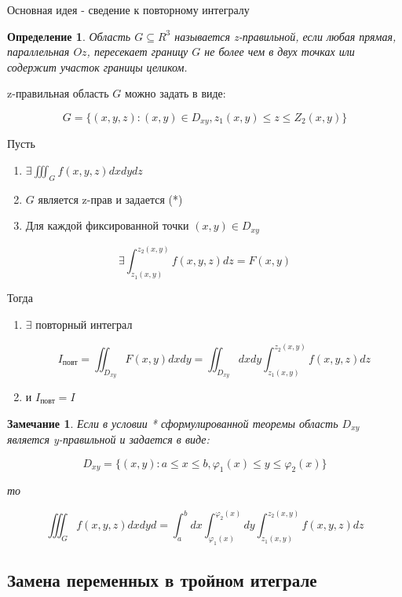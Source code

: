 \documentclass[a4paper, 14pt]{report}
\newtheorem{defenition}{Определение}[section]
\newtheorem{note}{Замечание}[section]
\begin{document}
Основная идея - сведение к повторному интегралу

\begin{defenition}
    Область $G \subseteq R^3$ называется z-правильной, если любая прямая, параллельная $Oz$, пересекает границу $G$ не более чем в двух точках или содержит участок границы целиком.
\end{defenition}

z-правильная область $G$ можно задать в виде:

$$
G = \{ (x,y,z) : (x,y) \in D_{xy}, z_1(x,y) \le z \le Z_2(x,y) \}
$$

\begin{theorem}
    Пусть

    \begin{enumerate}
        \item $\exists \iiint_G f(x,y,z) dxdydz$
        \item $G$ является z-прав и задается (*)
        \item Для каждой фиксированной точки $(x,y) \in D_{xy}$
    \end{enumerate}

    $$
    \exists \int_{z_1(x,y)}^{z_2(x,y)} f(x,y,z) dz = F(x,y)
    $$

    Тогда 

    \begin{enumerate}
        \item $\exists$ повторный интеграл

            $$
            I_\text{повт} = \iint_{D_{xy}} F(x,y) dxdy = \iint_{D_{xy}} dxdy \int_{z_1(x,y)}^{z_2(x,y)} f(x,y,z) dz
            $$

        \item и $I_\text{повт} = I$
    \end{enumerate}
\end{theorem}

\begin{note}
    Если в условии * сформулированной теоремы область $D_{xy}$ является y-правильной и задается в виде:

    $$
    D_{xy} = \{ (x,y): a \le x \le b, \varphi_1(x) \le y \le \varphi_2(x) \}
    $$

    то

    $$
    \iiint_G f(x,y,z) dxdyd = \int_a^bdx \int_{\varphi_1(x)}^{\varphi_2(x)} dy \int_{z_1(x,y)}^{z_2(x,y)} f(x,y,z) dz
    $$
\end{note}

\subsection{Замена переменных в тройном итеграле}
\end{document}
